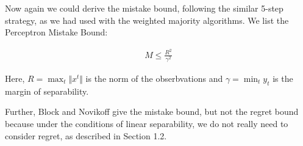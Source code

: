 \documentclass[11pt]{article}
\DeclareMathOperator*{\minimize}{min}
\DeclareMathOperator*{\maximize}{max}
\begin{document}
Now again we could derive the mistake bound, following the similar 5-step strategy, as we had used with the weighted majority algorithms. We list the Perceptron Mistake Bound:

\begin{align}
    M \leq \frac{R^{2}}{\gamma^{2}}
\end{align}

Here, $R = \maximize_{t} \Vert x^{t}\Vert$ is the norm of the obserbvations and $\gamma = \minimize_{t} y_{t} $ is the margin of separability.

Further, Block and Novikoff \cite{novikoff1963convergence} give the mistake bound, but not the regret bound because under the conditions of linear separability, we do not really need to consider regret, as described in Section 1.2.

{


}


\end{document}
